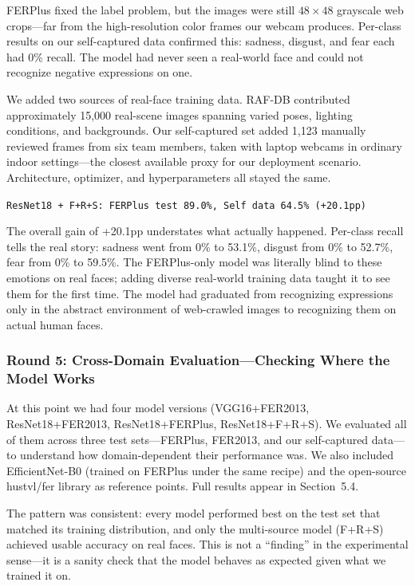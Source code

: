 \documentclass[12pt,a4paper]{article}
\begin{document}
FERPlus fixed the label problem, but the images were still $48\times48$ grayscale web crops---far from the high-resolution color frames our webcam produces. Per-class results on our self-captured data confirmed this: sadness, disgust, and fear each had 0\% recall. The model had never seen a real-world face and could not recognize negative expressions on one.

We added two sources of real-face training data. RAF-DB contributed approximately 15,000 real-scene images spanning varied poses, lighting conditions, and backgrounds. Our self-captured set added 1,123 manually reviewed frames from six team members, taken with laptop webcams in ordinary indoor settings---the closest available proxy for our deployment scenario. Architecture, optimizer, and hyperparameters all stayed the same.

\begin{center}
\texttt{ResNet18 + F+R+S: FERPlus test 89.0\%, Self data 64.5\% (+20.1pp)}
\end{center}

The overall gain of +20.1pp understates what actually happened. Per-class recall tells the real story: sadness went from 0\% to 53.1\%, disgust from 0\% to 52.7\%, fear from 0\% to 59.5\%. The FERPlus-only model was literally blind to these emotions on real faces; adding diverse real-world training data taught it to see them for the first time. The model had graduated from recognizing expressions only in the abstract environment of web-crawled images to recognizing them on actual human faces.

\subsubsection*{Round 5: Cross-Domain Evaluation---Checking Where the Model Works}

At this point we had four model versions (VGG16+FER2013, ResNet18+FER2013, ResNet18+FERPlus, ResNet18+F+R+S). We evaluated all of them across three test sets---FERPlus, FER2013, and our self-captured data---to understand how domain-dependent their performance was. We also included EfficientNet-B0 (trained on FERPlus under the same recipe) and the open-source hustvl/fer library as reference points. Full results appear in Section~5.4.

The pattern was consistent: every model performed best on the test set that matched its training distribution, and only the multi-source model (F+R+S) achieved usable accuracy on real faces. This is not a ``finding'' in the experimental sense---it is a sanity check that the model behaves as expected given what we trained it on.
\end{document}
